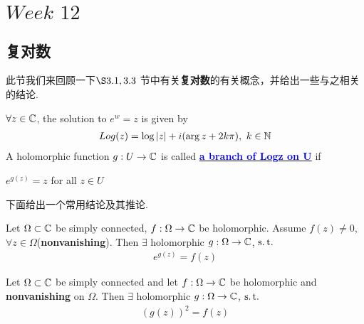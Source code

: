 \ifx\allfiles\undefined


	\else
	\fi

\chapter{$Week \,\, 12$}
\section{复对数}
	此节我们来回顾一下$\S 3.1, 3.3$ 节中有关\textbf{复对数}的有关概念，并给出一些与之相关的结论.
	\begin{defn}\label{def 12.1.1}
		$\forall z \in \mathbb{C}$, the solution to $e^w = z$ is given by
		\begin{align}
			Log(z) = \log{\left| z \right|} + i (\arg{z} + 2k\pi), \,\, k \in \mathbb{N}
		\end{align}
		A holomorphic function $g : U \rightarrow \mathbb{C}$ is called \underline{\textcolor{blue}{\textbf{a branch of Logz on U}}} if
		\begin{center}
			$e^{g(z)} = z$ for all $z \in U$
		\end{center}
	\end{defn}

\vspace*{4em}

	下面给出一个常用结论及其推论.
	\begin{proposition}\label{prop 12.1.1}
		Let $\Omega \subset \mathbb{C}$ be simply connected, $f : \Omega \rightarrow \mathbb{C}$ be holomorphic. Assume $f(z) \neq 0$, $\forall z \in \Omega$(\textbf{nonvanishing}). Then $\exists$ holomorphic $g : \Omega \rightarrow \mathbb{C}$, $\operatorname{s.t.}$
		\begin{align}
			e^{g(z)} = f(z)
		\end{align}
	\end{proposition}
	
	\vspace*{2em}
	
	\begin{corollary}\label{cor 12.1.1}
		Let $\Omega \subset \mathbb{C}$ be simply connected and let $f : \Omega \rightarrow \mathbb{C}$ be holomorphic and \textbf{nonvanishing} on $\Omega$. Then $\exists$ holomorphic $g : \Omega \rightarrow \mathbb{C}$, $\operatorname{s.t.}$
		\begin{align}
			\left( g(z) \right)^2 = f(z)
		\end{align}
	\end{corollary}

